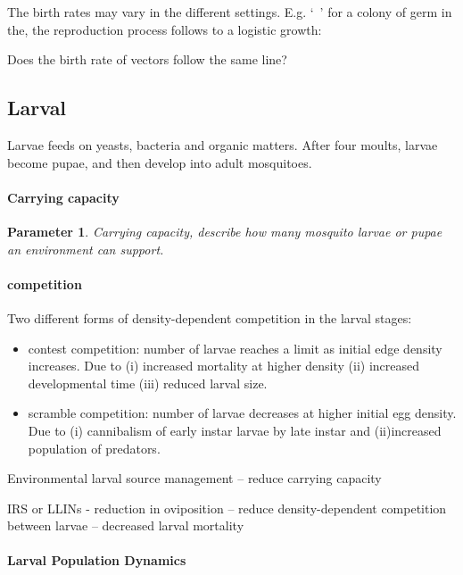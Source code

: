 \documentclass[a4paper, 12pt, twoside]{article}
\newtheorem{parameter}{Parameter}
\begin{document}
The birth rates may vary in the different settings.
E.g. `\ ' for a colony of germ in the, the reproduction process follows to a logistic growth:

Does the birth rate of vectors follow the same line?

\subsection{Larval}

Larvae feeds on yeasts, bacteria and organic matters.
After four moults, larvae become pupae, and then develop into adult mosquitoes.

\paragraph{Carrying capacity}%
\label{par:carrying_capacity}
\begin{parameter}
	Carrying capacity, describe how many mosquito larvae or pupae an environment can support.
\end{parameter}

\paragraph{competition}%
\label{par:competition}
Two different forms of density-dependent competition in the larval stages:

\begin{itemize}
	\item contest competition: number of larvae reaches a limit as initial edge density increases. Due to (i) increased mortality at higher density (ii) increased developmental time (iii) reduced larval size.
	\item scramble competition: number of larvae decreases at higher initial egg density. Due to (i) cannibalism of early instar larvae by late instar and (ii)increased population of predators.
\end{itemize}

Environmental larval source management -- reduce carrying capacity

IRS or LLINs - reduction in oviposition -- reduce density-dependent competition between larvae -- decreased larval mortality

\paragraph{Larval Population Dynamics}%
\label{par:larval_population_dynamics}
\end{document}
